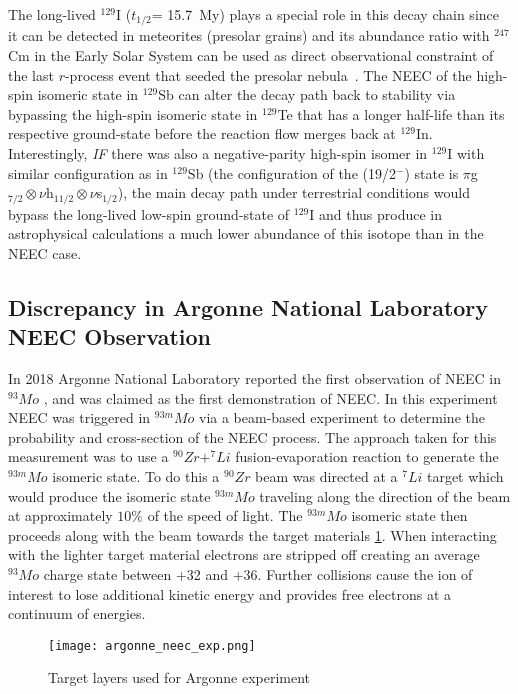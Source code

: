 \documentclass[cnatzke_thesis_proposal.tex]{subfiles}
\begin{document}
    The long-lived $^{129}$I ($t_{1/2}$= 15.7~My) plays a special role in this decay chain since it can be detected in meteorites (presolar grains) and its abundance ratio with $^{247}$Cm in the Early Solar System can be used as direct observational constraint of the last $r$-process event that seeded the presolar nebula~\cite{Ben21}.
    The NEEC of the high-spin isomeric state in $^{129}$Sb can alter the decay path back to stability via bypassing the high-spin isomeric state in $^{129}$Te that has a longer half-life than its respective ground-state before the reaction flow merges back at $^{129}$In.
    Interestingly, \textit{IF} there was also a negative-parity high-spin isomer in $^{129}$I with similar configuration as in $^{129}$Sb (the configuration of the (19/2$^-$) state is $\pi$g$_{7/2}\otimes\nu$h$_{11/2}\otimes\nu$s$_{1/2}$), the main decay path under terrestrial conditions would bypass the long-lived low-spin ground-state of $^{129}$I and thus produce in astrophysical calculations a much lower abundance of this isotope than in the NEEC case.

    \subsection{\label{discrepancy} Discrepancy in Argonne National Laboratory NEEC Observation}
    In 2018 Argonne National Laboratory reported the first observation of NEEC in  $^{93}Mo$ \cite{Chiara2018}, and was claimed as the first demonstration of NEEC.
    In this experiment NEEC was triggered in $^{93m}Mo$ via a beam-based experiment to determine the probability and cross-section of the NEEC process.
    The approach taken for this measurement was to use a $^{90}Zr + ^{7}Li$ fusion-evaporation reaction to generate the $^{93m}Mo$ isomeric state.
    To do this a $^{90}Zr$ beam was directed at a $^{7}Li$ target which would produce the isomeric state $^{93m}Mo$ traveling along the direction of the beam at approximately $10\%$ of the speed of light.
    The $^{93m}Mo$ isomeric state then proceeds along with the beam towards the target materials \ref{fig:argonne_neec_exp}.
    When interacting with the lighter target material electrons are stripped off creating an average $^{93}Mo$ charge state between +32 and +36.
    Further collisions cause the ion of interest to lose additional kinetic energy and provides free electrons at a continuum of energies.

    \begin{figure}[H]
        \begin{center}
            \texttt{[image: argonne\_neec\_exp.png]}
        \end{center}
        \caption{Target layers used for Argonne experiment \cite{Chiara2018}}
        \label{fig:argonne_neec_exp}
    \end{figure}
\end{document}
